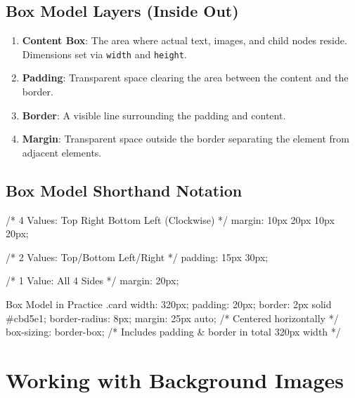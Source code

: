 \subsection{Box Model Layers (Inside Out)}
\begin{enumerate}[leftmargin=1.5em]
    \item \textbf{Content Box}: The area where actual text, images, and child nodes reside. Dimensions set via \texttt{width} and \texttt{height}.
    \item \textbf{Padding}: Transparent space clearing the area between the content and the border.
    \item \textbf{Border}: A visible line surrounding the padding and content.
    \item \textbf{Margin}: Transparent space outside the border separating the element from adjacent elements.
\end{enumerate}

\subsection{Box Model Shorthand Notation}
\begin{syntaxbox}
/* 4 Values: Top Right Bottom Left (Clockwise) */
margin: 10px 20px 10px 20px;

/* 2 Values: Top/Bottom  Left/Right */
padding: 15px 30px;

/* 1 Value: All 4 Sides */
margin: 20px;
\end{syntaxbox}

\begin{csscode}{Box Model in Practice}
.card {
    width: 320px;
    padding: 20px;
    border: 2px solid #cbd5e1;
    border-radius: 8px;
    margin: 25px auto; /* Centered horizontally */
    box-sizing: border-box; /* Includes padding & border in total 320px width */
}
\end{csscode}

\section{Working with Background Images}


